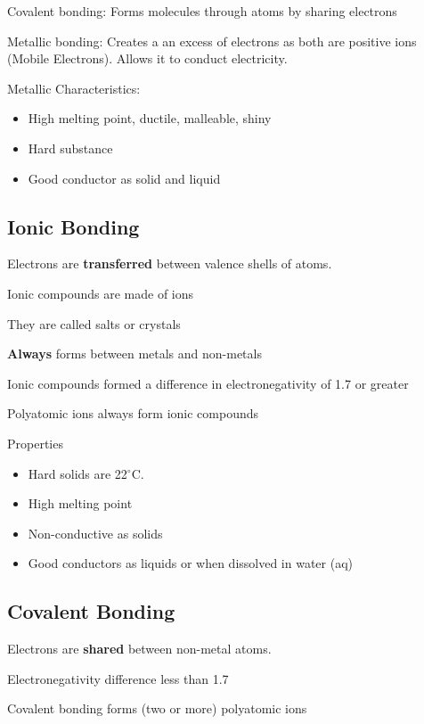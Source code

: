 \documentclass[12pt]{article}
\begin{document}
\noindent Covalent bonding: Forms molecules through atoms by sharing electrons

\noindent Metallic bonding: Creates a an excess of electrons as both are positive ions (Mobile Electrons). Allows it to conduct electricity.

\medskip
\noindent Metallic Characteristics:

\begin{itemize}
    \item High melting point, ductile, malleable, shiny
    \item Hard substance
    \item Good conductor as solid and liquid
\end{itemize}

\subsection{Ionic Bonding}

Electrons are \textbf{transferred} between valence shells of atoms.

\noindent Ionic compounds are made of ions

They are called salts or crystals 

\medskip
\noindent \textbf{Always} forms between metals and non-metals

Ionic compounds formed a difference in electronegativity of 1.7 or greater

\medskip
\noindent Polyatomic ions always form ionic compounds

Properties

\begin{itemize}
    \item Hard solids are 22$^{\circ}$C.
    \item High melting point
    \item Non-conductive as solids
    \item Good conductors as liquids or when dissolved in water (aq)
\end{itemize}

\subsection{Covalent Bonding}
Electrons are \textbf{shared} between non-metal atoms.

Electronegativity difference less than 1.7

\medskip
\noindent Covalent bonding forms (two or more) polyatomic ions
\end{document}
